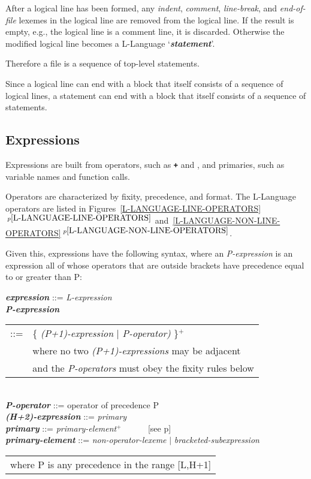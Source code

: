 \documentclass[12pt]{article}
\newcommand{\TT}[1]{{\tt \bfseries #1}}
\newcommand{\PLUS}[1][]{{$^{+#1}$}}
\newcommand{\emkey}[1]{{\em \bfseries #1}}
\newcommand{\itemref}[1]{\ref{#1}$\,^{p\pageref{#1}}$}
\newcommand{\pagref}[1]{p\pageref{#1}}
\newenvironment{indpar}[1][0.3in]%
	{\begin{list}{}%
		     {\setlength{\itemsep}{0in}%
		      \setlength{\topsep}{0in}%
		      \setlength{\parsep}{1ex}%
		      \setlength{\labelwidth}{#1}%
		      \setlength{\leftmargin}{#1}%
		      \addtolength{\leftmargin}{\labelsep}}%
	 \item}%
	{\end{list}}
\begin{document}
After a logical line
has been formed, any {\em indent},
{\em comment}, {\em line-break}, and {\em end-of-file}
lexemes in the logical line
are removed from the logical line.  If the result is
empty, e.g., the logical line is a comment line, it is discarded.
Otherwise the
modified logical line becomes a L-Language `\emkey{statement}'.

Therefore a file is a sequence of top-level statements.

Since a logical line can end with a block that itself consists
of a sequence of logical lines, a statement can end with
a block that itself consists of a sequence of statements.

\newpage

\subsection{Expressions}

Expressions are built from operators, such as \TT{+} and \TT{*},
and primaries, such as variable names and function calls.

Operators are characterized by fixity, precedence, and format.
The L-Language operators are listed in
Figures~\itemref{L-LANGUAGE-LINE-OPERATORS}
and~\itemref{L-LANGUAGE-NON-LINE-OPERATORS}.


Given this, expressions have the following syntax,
where an {\em P-expression}
is an expression all of whose operators that are outside brackets
have precedence equal to or greater than P:

\begin{indpar}\begin{minipage}{6in}
\emkey{expression}\label{EXPRESSION} ::= {\em L-expression}
\\[0.5ex]
\emkey{P-expression}
    \begin{tabular}[t]{@{}rl}
    ::= & \{ {\em (P+1)-expression} $|$ {\em P-operator)} \}\PLUS{} \\
        & where no two {\em (P+1)-expressions} may be adjacent \\ 
        & and the {\em P-operators} must obey the fixity rules below \\
    \end{tabular}
\\[0.5ex]
\emkey{P-operator} ::= operator of precedence P
\\[0.5ex]
\emkey{(H+2)-expression} ::= {\em primary}
\\[0.5ex]
\emkey{primary} ::= {\em primary-element}\PLUS{} ~~~~~ [see \pagref{PRIMARIES}]
\\[0.5ex]
\emkey{primary-element} ::= {\em non-operator-lexeme} $|$
                            {\em bracketed-subexpression}
\\[2.0ex]
\hspace*{3em}\begin{tabular}{l}
where P is any precedence in the range [L,H+1]
\end{tabular}
\end{minipage}\end{indpar}
\end{document}
